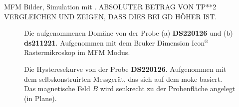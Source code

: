 MFM Bilder, Simulation mit . ABSOLUTER BETRAG VON TP**2 VERGLEICHEN UND ZEIGEN, DASS DIES BEI GD HÖHER IST.
\begin{figure}[ht]
    \centering
    \hspace{5mm}
    \caption{Die aufgenommenen Domäne von der Probe (a) \textbf{DS220126} und (b) \textbf{ds211221}. Aufgenommen mit dem Bruker Dimension Icon$^{\text{®}}$ Rastermikroskop im MFM Modus.}
    \label{fig:mfm_amplitude}
\end{figure}
\begin{figure}[ht]
    \centering
    
    \caption{Die Hysteresekurve von der Probe \textbf{DS220126}. Aufgenommen mit dem selbskonstruirten Messgerät, das sich auf dem \gls{moke} basiert. Das magnetische Feld $B$ wird senkrecht zu der Probenfläche angelegt (in Plane).}
    \label{fig:hysterese_sample}
\end{figure}

\newpage